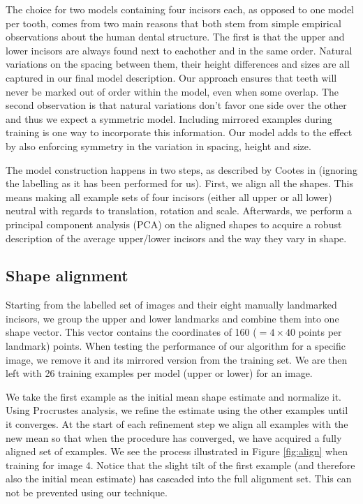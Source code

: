 \documentclass[a4paper,titlepage,12pt]{article}
\begin{document}
The choice for two models containing four incisors each, as opposed to one model per tooth, comes from two main reasons that both stem from simple empirical observations about the human dental structure. The first is that the upper and lower incisors are always found next to eachother and in the same order. Natural variations on the spacing between them, their height differences and sizes are all captured in our final model description. Our approach ensures that teeth will never be marked out of order within the model, even when some overlap. The second observation is that natural variations don't favor one side over the other and thus we expect a symmetric model. Including mirrored examples during training is one way to incorporate this information. Our model adds to the effect by also enforcing symmetry in the variation in spacing, height and size.

The model construction happens in two steps, as described by Cootes in \cite{cootes2000introduction} (ignoring the labelling as it has been performed for us). First, we align all the shapes. This means making all example sets of four incisors (either all upper or all lower) neutral with regards to translation, rotation and scale. Afterwards, we perform a principal component analysis (PCA) on the aligned shapes to acquire a robust description of the average upper/lower incisors and the way they vary in shape. 

\subsection{Shape alignment}
Starting from the labelled set of images and their eight manually landmarked incisors, we group the upper and lower landmarks and combine them into one shape vector. This vector contains the coordinates of 160 ($= 4\times 40$ points per landmark) points. When testing the performance of our algorithm for a specific image, we remove it and its mirrored version from the training set. We are then left with 26 training examples per model (upper or lower) for an image.

We take the first example as the initial mean shape estimate and normalize it. Using Procrustes analysis, we refine the estimate using the other examples until it converges. At the start of each refinement step we align all examples with the new mean so that when the procedure has converged, we have acquired a fully aligned set of examples. We see the process illustrated in Figure \ref{fig:align} when training for image 4. Notice that the slight tilt of the first example (and therefore also the initial mean estimate) has cascaded into the full alignment set. This can not be prevented using our technique.
\end{document}
